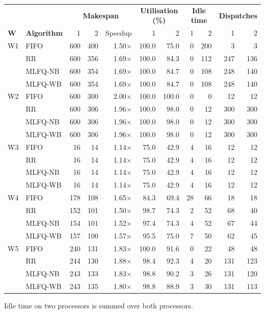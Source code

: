 \documentclass[11pt,a4paper]{article}
\begin{document}
\begin{center}\footnotesize\setlength{\tabcolsep}{4.5pt}
\begin{tabular}{ll rrr rr rr rr}
\toprule
& & \multicolumn{3}{c}{\textbf{Makespan}} & \multicolumn{2}{c}{\textbf{Utilisation (\%)}} & \multicolumn{2}{c}{\textbf{Idle time}} & \multicolumn{2}{c}{\textbf{Dispatches}}\\
\cmidrule(lr){3-5}\cmidrule(lr){6-7}\cmidrule(lr){8-9}\cmidrule(lr){10-11}
\textbf{W} & \textbf{Algorithm} & 1 & 2 & Speedup & 1 & 2 & 1 & 2 & 1 & 2\\
\midrule
W1 & FIFO & 600 & 400 & 1.50$\times$ & 100.0 & 75.0 & 0 & 200 & 3 & 3 \\
 & RR & 600 & 356 & 1.69$\times$ & 100.0 & 84.3 & 0 & 112 & 247 & 136 \\
 & MLFQ-NB & 600 & 354 & 1.69$\times$ & 100.0 & 84.7 & 0 & 108 & 248 & 140 \\
 & MLFQ-WB & 600 & 354 & 1.69$\times$ & 100.0 & 84.7 & 0 & 108 & 248 & 140 \\
\midrule
W2 & FIFO & 600 & 300 & 2.00$\times$ & 100.0 & 100.0 & 0 & 0 & 12 & 12 \\
 & RR & 600 & 306 & 1.96$\times$ & 100.0 & 98.0 & 0 & 12 & 300 & 300 \\
 & MLFQ-NB & 600 & 306 & 1.96$\times$ & 100.0 & 98.0 & 0 & 12 & 300 & 300 \\
 & MLFQ-WB & 600 & 306 & 1.96$\times$ & 100.0 & 98.0 & 0 & 12 & 300 & 300 \\
\midrule
W3 & FIFO & 16 & 14 & 1.14$\times$ & 75.0 & 42.9 & 4 & 16 & 12 & 12 \\
 & RR & 16 & 14 & 1.14$\times$ & 75.0 & 42.9 & 4 & 16 & 12 & 12 \\
 & MLFQ-NB & 16 & 14 & 1.14$\times$ & 75.0 & 42.9 & 4 & 16 & 12 & 12 \\
 & MLFQ-WB & 16 & 14 & 1.14$\times$ & 75.0 & 42.9 & 4 & 16 & 12 & 12 \\
\midrule
W4 & FIFO & 178 & 108 & 1.65$\times$ & 84.3 & 69.4 & 28 & 66 & 18 & 18 \\
 & RR & 152 & 101 & 1.50$\times$ & 98.7 & 74.3 & 2 & 52 & 68 & 40 \\
 & MLFQ-NB & 154 & 101 & 1.52$\times$ & 97.4 & 74.3 & 4 & 52 & 67 & 44 \\
 & MLFQ-WB & 157 & 100 & 1.57$\times$ & 95.5 & 75.0 & 7 & 50 & 62 & 45 \\
\midrule
W5 & FIFO & 240 & 131 & 1.83$\times$ & 100.0 & 91.6 & 0 & 22 & 48 & 48 \\
 & RR & 244 & 130 & 1.88$\times$ & 98.4 & 92.3 & 4 & 20 & 131 & 123 \\
 & MLFQ-NB & 243 & 133 & 1.83$\times$ & 98.8 & 90.2 & 3 & 26 & 131 & 120 \\
 & MLFQ-WB & 243 & 135 & 1.80$\times$ & 98.8 & 88.9 & 3 & 30 & 131 & 113 \\
\bottomrule\end{tabular}\end{center}
\noindent Idle time on two processors is summed over both processors.
\end{document}
